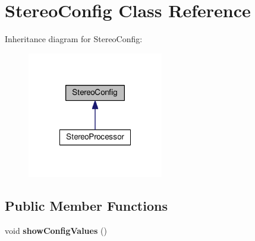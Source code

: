 \hypertarget{class_stereo_config}{}\section{Stereo\+Config Class Reference}
\label{class_stereo_config}


Inheritance diagram for Stereo\+Config\+:
\nopagebreak
\begin{figure}[H]
\begin{center}
\leavevmode
\includegraphics[width=168pt]{class_stereo_config__inherit__graph}
\end{center}
\end{figure}
\subsection*{Public Member Functions}
\begin{DoxyCompactItemize}
\item 
void {\bfseries show\+Config\+Values} ()\hypertarget{class_stereo_config_a6fe1655471974d26a20d362916132697}{}\label{class_stereo_config_a6fe1655471974d26a20d362916132697}

\end{DoxyCompactItemize}
